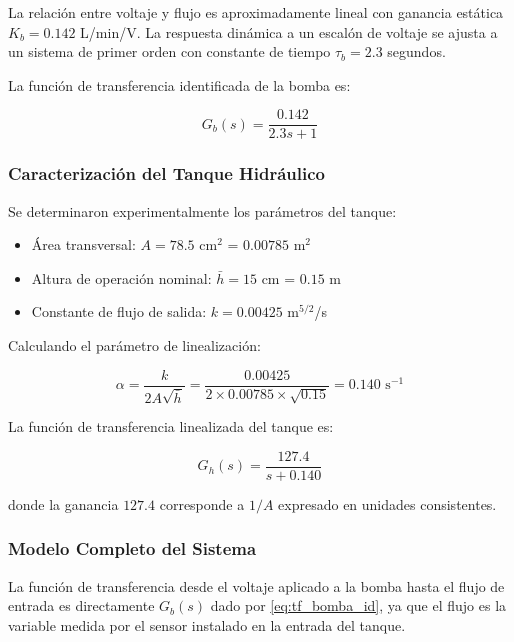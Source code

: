 \documentclass[conference]{IEEEtran}
\begin{document}
La relación entre voltaje y flujo es aproximadamente lineal con ganancia estática $K_b = 0.142$ L/min/V. La respuesta dinámica a un escalón de voltaje se ajusta a un sistema de primer orden con constante de tiempo $\tau_b = 2.3$ segundos.

La función de transferencia identificada de la bomba es:

\begin{equation}
G_b(s) = \frac{0.142}{2.3s + 1}
\label{eq:tf_bomba_id}
\end{equation}

\subsubsection{Caracterización del Tanque Hidráulico}

Se determinaron experimentalmente los parámetros del tanque:

\begin{itemize}
\item Área transversal: $A = 78.5$ cm$^2$ = $0.00785$ m$^2$
\item Altura de operación nominal: $\bar{h} = 15$ cm = $0.15$ m
\item Constante de flujo de salida: $k = 0.00425$ m$^{5/2}$/s
\end{itemize}

Calculando el parámetro de linealización:

\begin{equation}
\alpha = \frac{k}{2A\sqrt{\bar{h}}} = \frac{0.00425}{2 \times 0.00785 \times \sqrt{0.15}} = 0.140 \text{ s}^{-1}
\end{equation}

La función de transferencia linealizada del tanque es:

\begin{equation}
G_h(s) = \frac{127.4}{s + 0.140}
\label{eq:tf_tanque_id}
\end{equation}

donde la ganancia $127.4$ corresponde a $1/A$ expresado en unidades consistentes.

\subsubsection{Modelo Completo del Sistema}

La función de transferencia desde el voltaje aplicado a la bomba hasta el flujo de entrada es directamente $G_b(s)$ dado por \eqref{eq:tf_bomba_id}, ya que el flujo es la variable medida por el sensor instalado en la entrada del tanque.
\end{document}
